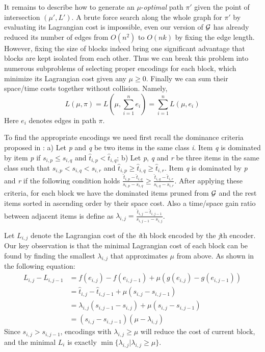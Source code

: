 \documentclass{sig-alternate-05-2015}
\begin{document}
It remains to describe how to generate an $ \mu $-\textit{optimal} path $ \pi' $ given the point of intersection $ (\mu',L') $.
A brute force search along the whole graph for $ \pi' $ by evaluating its Lagrangian cost is impossible,
even our version of  $ \cal G $ has already reduced its number of edges from $ O(n^2) $ to $ O(nk) $ by fixing the edge length.
However, fixing the size of blocks indeed bring one significant advantage that blocks are kept isolated from each other.
Thus we can break this problem into numerous subproblems of selecting proper encodings for each block, which minimize its Lagrangian cost given any $ \mu \geqslant 0 $.
Finally we can sum their space/time costs together without collision.
Namely,
\begin{equation*}
L(\mu,\pi) = L(\mu, \sum_{i=1}^{n} e_i)=\sum_{i=1}^{n}L(\mu, e_i)
\end{equation*}
Here $ e_i $ denotes edges in path $ \pi $.

To find the appropriate encodings we need first recall the dominance criteria proposed in \cite{ottaviano2015optimal}: a) Let \textit{p} and \textit{q} be two items in the same class \textit{i}.
Item \textit{q} is dominated by item \textit{p} if $ s_{i,p} \leqslant s_{i,q} $ and $ \hat{t}_{i,p} < \hat{t}_{i,q} $;
b) Let \textit{p}, \textit{q} and \textit{r} be three items in the same class such that $ s_{i,p} < s_{i,q} < s_{i,r} $ and $ \hat{t}_{i,p} \geqslant \hat{t}_{i,q} \geqslant \hat{t}_{i,r} $.
Item \textit{q} is dominated by \textit{p} and \textit{r} if the following condition holds $ \frac{\hat{t}_{i,p} - \hat{t}_{i,q}}{s_{i,p} - s_{i,q}} \geqslant \frac{\hat{t}_{i,q} - \hat{t}_{i,r}}{s_{i,q} - s_{i,r}} $.
After applying these criteria, for each block we have the dominated items pruned from $ \cal G $ and the rest items sorted in ascending order by their space cost.
Also a time/space gain ratio between adjacent items is define as $ \lambda_{i,j} = \frac{\hat{t}_{i,j} - \hat{t}_{i,j-1}}{s_{i,j-1} - s_{i,j}} $.

Let $ L_{i,j} $ denote the Lagrangian cost of the \textit{i}th block encoded by the \textit{j}th encoder.
Our key observation is that the minimal Lagrangian cost of each block can be found by finding the smallest $ \lambda_{i,j} $ that approximates $ \mu $ from above.
As shown in the following equation:
\begin{equation}
\begin{split}
L_{i,j} - L_{i,j-1} &= f(e_{i,j}) - f(e_{i,j-1}) + \mu (g(e_{i,j}) - g(e_{i,j-1})) \\
	&= \hat{t}_{i,j} - \hat{t}_{i,j-1} + \mu (s_{i,j} - s_{i,j-1}) \\
	&= \lambda_{i,j}(s_{i,j-1} - s_{i,j}) + \mu (s_{i,j} - s_{i,j-1}) \\
	&= (s_{i,j} - s_{i,j-1})(\mu - \lambda_{i,j})
\end{split}
\end{equation}
Since $ s_{i,j} > s_{i,j-1} $, encodings with $ \lambda_{i,j} \geqslant \mu $ will reduce the cost of current block,
and the minimal $ L_i $ is exactly $\min\{ \lambda_{i,j}| \lambda_{i,j} \geqslant \mu \} $.
\end{document}
